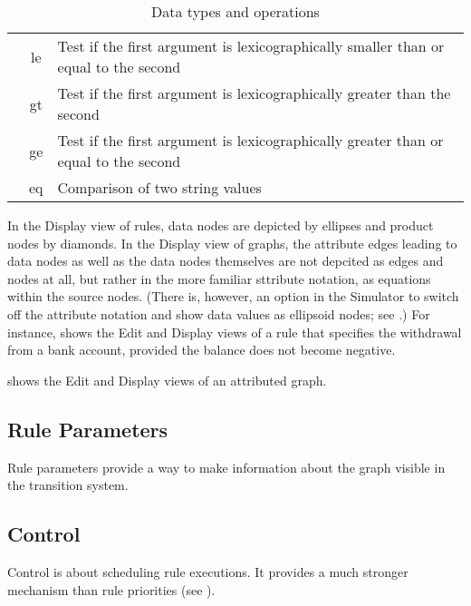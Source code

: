 \begin{table}
\begin{center}
\begin{tabular}{|c|c|l|}
  & \sf le & Test if the first argument is
  lexicographically smaller than or equal to the second \\
  & \sf gt & Test if the first argument is
  lexicographically greater than the second \\
  & \sf ge &Test if the first argument is
  lexicographically greater than or equal to the second \\
  & \sf eq & Comparison of two string values \\
\hline\hline
\end{tabular}
\end{center}
\vspace*{-\medskipamount}
\caption{Data types and operations}
\vspace*{-\medskipamount}
\end{table}

In the Display view of rules, data nodes are depicted by ellipses and product
nodes by diamonds. In the Display view of graphs, the attribute edges leading
to data nodes as well as the data nodes themselves are not depcited as edges
and nodes at all, but rather in the more familiar sttribute notation, as
equations within the source nodes. (There is, however, an option in the
Simulator to switch off the attribute notation and show data values as
ellipsoid nodes; see .) For instance,
 shows the Edit and Display views of a rule that specifies
the withdrawal from a bank account, provided the balance does not
become negative.


 shows the Edit and Display views of an attributed graph.


\subsection{Rule Parameters}

Rule parameters provide a way to make information about the graph visible in
the transition system.

\subsection{Control}

Control is about scheduling rule executions. It provides a much stronger
mechanism than rule priorities (see ).

